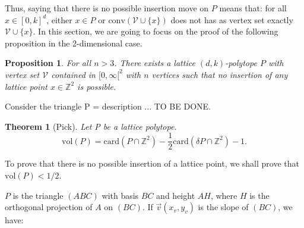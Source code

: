 \documentclass[a4paper]{article}
\newtheorem{theorem}{Theorem}
\newtheorem{lemma}{Lemma}[section]
\newtheorem{proposition}{Proposition}[section]
\newcommand{\V}{\mathcal{V}}
\begin{document}
Thus, saying that there is no possible insertion move on $P$ means that: for all $x \in [0,k]^d$, either $x \in P$ or $\mathrm{conv}(\mathcal{V} \cup \{x\})$ does not has as vertex set exactly $\mathcal{V} \cup \{x\}$. In this section, we are going to focus on the proof of the following proposition in the 2-dimensional case.





\begin{proposition}
  For all $n>3$. There exists a lattice $(d,k)$-polytope $P$ with vertex set $\mathcal{V}$ contained in $[0,\infty[^2$ with $n$ vertices such that no insertion of any lattice point $x \in \mathbb{Z}^2$ is possible.
\end{proposition}



Consider the triangle P = description ... TO BE DONE.

\begin{theorem}[Pick]
  Let P be a lattice polytope.
  $$
    \mathrm{vol}(P) = \mathrm{card}(P \cap \mathbb{Z}^2) - \frac{1}{2} \mathrm{card}(\delta P \cap \mathbb{Z}^2) - 1.
  $$
\end{theorem}

To prove that there is no possible insertion of a lattice point, we shall prove that $\mathrm{vol}(P)< 1/2$.

$P$ is the triangle $(ABC)$ with basis $BC$ and height $AH$, where $H$ is the orthogonal projection of $A$ on $(BC)$. If $\vec{v} (x_v,y_v)$ is the slope of $(BC)$, we have:
\end{document}

